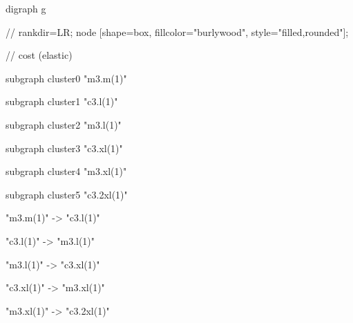 digraph g{
  // rankdir=LR;
  node [shape=box, fillcolor="burlywood", style="filled,rounded"];
   
  // cost (elastic)

  subgraph cluster0 {
    "m3.m(1)"   
  }

  subgraph cluster1 {
     "c3.l(1)"
  }

  subgraph cluster2 {
    "m3.l(1)" 
  }
  
  subgraph cluster3 {
    "c3.xl(1)"
  }
  
  subgraph cluster4 {
    "m3.xl(1)"
  }
  
  subgraph cluster5 {
    "c3.2xl(1)"
  }  

  "m3.m(1)" -> "c3.l(1)" 

  "c3.l(1)" -> "m3.l(1)" 

  "m3.l(1)" -> "c3.xl(1)"

  "c3.xl(1)" -> "m3.xl(1)"

  "m3.xl(1)" -> "c3.2xl(1)"
  

}